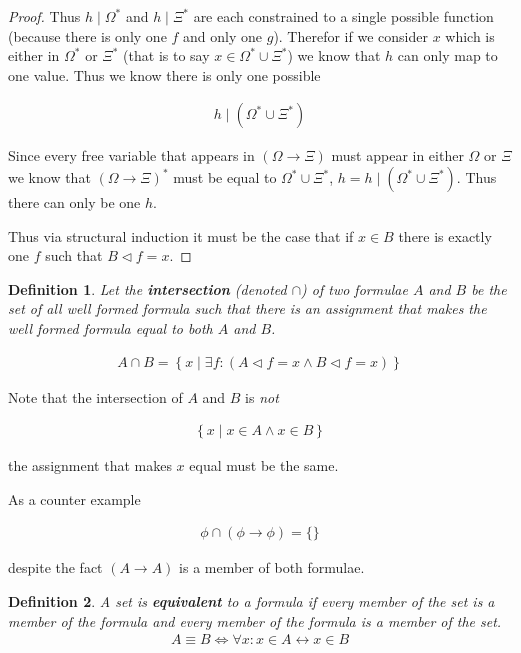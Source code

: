 \documentclass{article}
\newtheorem{defin}{Definition}
\begin{document}
\begin{proof}
Thus $h \mid \Omega^\ast$ and $h \mid \Xi^\ast$ are each constrained to a single possible function (because there is only one $f$ and only one $g$).
Therefor if we consider $x$ which is either in $\Omega^\ast$ or $\Xi^\ast$ (that is to say $x \in \Omega^\ast \cup \Xi^\ast$) we know that $h$ can only map to one value.
Thus we know there is only one possible  

\begin{align*}
h \mid (\Omega^\ast \cup \Xi^\ast)
\end{align*}

Since every free variable that appears in $(\Omega \rightarrow \Xi)$ must appear in either $\Omega$ or $\Xi$ we know that $(\Omega \rightarrow \Xi)^\ast$ must be equal to
$\Omega^\ast \cup \Xi^\ast$, $h = h \mid (\Omega^\ast \cup \Xi^\ast)$.
Thus there can only be one $h$.

Thus via structural induction it must be the case that 
if $x \in B$ there is exactly one $f$ such that $B \lhd f = x$.
\end{proof}

\begin{defin}
Let the \textbf{intersection} (denoted $\cap$) of two formulae $A$ and $B$ be the set of all well formed formula such that there is an assignment that makes the well formed formula equal to both $A$ and $B$.

\begin{align*}
A \cap B = \left\{x \mid \exists f: (A \lhd f = x \land B \lhd f = x)\right\}
\end{align*}
\end{defin}

Note that the intersection of $A$ and $B$ is \textit{not}

\begin{align*}
\left\{x \mid x \in A \land x \in B\right\}
\end{align*}

the assignment that makes $x$ equal must be the same.

As a counter example

\begin{align*}
\phi \cap (\phi \rightarrow \phi) = \{\}
\end{align*}

despite the fact $(A \rightarrow A)$ is a member of both formulae.

\begin{defin}
A set is \textbf{equivalent} to a formula if every member of the set is a member of the formula and every member of the formula is a member of the set.
\begin{align*}
A \equiv B \iff \forall x: x \in A \leftrightarrow x \in B
\end{align*}
\end{defin}
\end{document}

